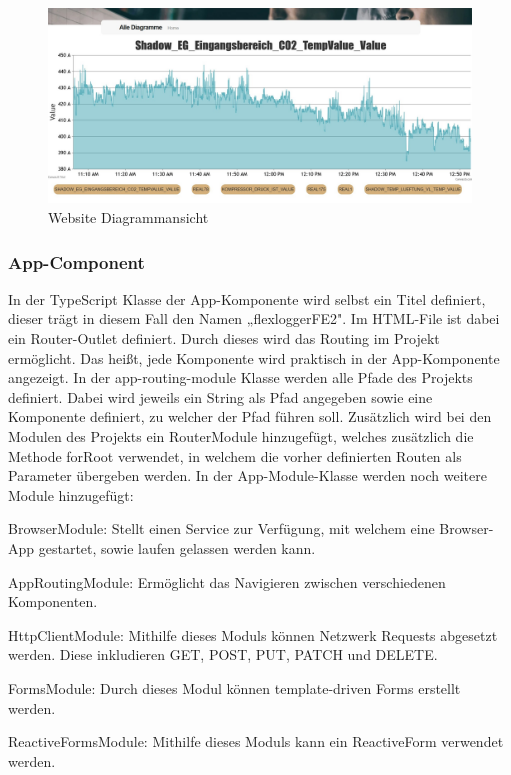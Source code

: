 \begin{figure}
    \centering
    \includegraphics[scale=0.35]{pics/FlexLoggerWebsiteDiagramm.jpg}
    \caption{Website Diagrammansicht}
    \label{fig:impl:FlexLoggerDiagrammAnsicht}
\end{figure}
 
\subsubsection{App-Component}
In der TypeScript Klasse der App-Komponente wird selbst ein Titel definiert, dieser trägt in diesem Fall den Namen „flexloggerFE2". Im HTML-File ist dabei ein Router-Outlet definiert. Durch dieses wird das Routing im Projekt ermöglicht. Das heißt, jede Komponente wird praktisch in der App-Komponente angezeigt. In der app-routing-module Klasse werden alle Pfade des Projekts definiert. Dabei wird jeweils ein String als Pfad angegeben sowie eine Komponente definiert, zu welcher der Pfad führen soll. Zusätzlich wird bei den Modulen des Projekts ein RouterModule hinzugefügt, welches zusätzlich die Methode forRoot verwendet, in welchem die vorher definierten Routen als Parameter übergeben werden. In der App-Module-Klasse werden noch weitere Module hinzugefügt:
 
\begin{compactitem}
    \item BrowserModule: Stellt einen Service zur Verfügung, mit welchem eine Browser-App gestartet, sowie laufen gelassen werden kann.   
    \item AppRoutingModule: Ermöglicht das Navigieren zwischen verschiedenen Komponenten.    
    \item HttpClientModule: Mithilfe dieses Moduls können Netzwerk Requests abgesetzt werden. Diese inkludieren GET, POST, PUT, PATCH und DELETE.   
    \item FormsModule: Durch dieses Modul können template-driven Forms erstellt werden.   
    \item ReactiveFormsModule: Mithilfe dieses Moduls kann ein ReactiveForm verwendet werden.
\end{compactitem}
 
